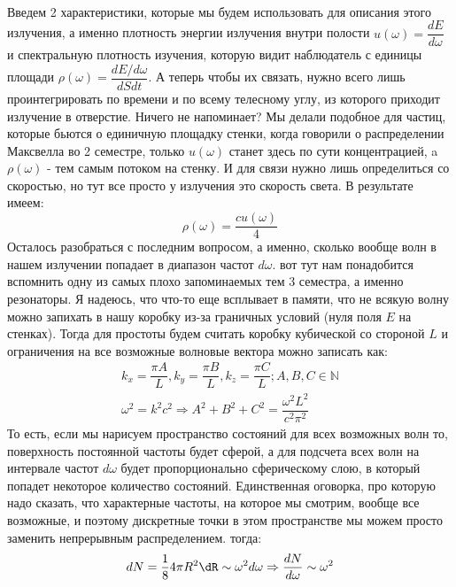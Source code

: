 \documentclass[12pt]{article}
\begin{document}
\\
Введем 2 характеристики, которые мы будем использовать для описания этого излучения, а именно плотность энергии излучения внутри полости $u(\omega) = \dfrac{dE}{d\omega}$ и спектральную плотность изучения, которую видит наблюдатель с единицы площади $\rho(\omega) = \dfrac{dE/d\omega}{dSdt}$. А теперь чтобы их связать, нужно всего лишь проинтегрировать по времени и по всему телесному углу, из которого приходит излучение в отверстие. Ничего не напоминает? Мы делали подобное для частиц, которые бьются о единичную площадку стенки, когда говорили о распределении Максвелла во 2 семестре, только $u(\omega)$ станет здесь по сути концентрацией, a $\rho(\omega)$ - тем самым потоком на стенку. И для связи нужно лишь определиться со скоростью, но тут все просто у излучения это скорость света. В результате имеем:
\begin{equation}
    \rho(\omega) = \dfrac{cu(\omega)}{4}
\end{equation}
Осталось разобраться с последним вопросом, а именно, сколько вообще волн в нашем излучении попадает в диапазон частот $d\omega$. вот тут нам понадобится вспомнить одну из самых плохо запоминаемых тем 3 семестра, а именно резонаторы. Я надеюсь, что что-то еще всплывает в памяти, что не всякую волну можно запихать в нашу коробку из-за граничных условий (нуля поля $E$ на стенках). Тогда для простоты будем считать коробку кубической со стороной $L$ и ограничения на все возможные волновые вектора можно записать как:
\begin{gather*}
    k_x = \dfrac{\pi A}{L}, k_y = \dfrac{\pi B}{L}, k_z = \dfrac{\pi C}{L}; A, B, C\in \mathbb{N}\\
    \omega^2 = k^2c^2 \Rightarrow A^2+B^2+C^2 = \dfrac{\omega^2L^2}{c^2\pi^2}
\end{gather*}
То есть, если мы нарисуем пространство состояний для всех возможных волн то, поверхность постоянной частоты будет сферой, а для подсчета всех волн на интервале частот $d\omega$ будет пропорционально сферическому слою, в который попадет некоторое количество состояний. Единственная оговорка, про которую надо сказать, что характерные частоты, на которое мы смотрим, вообще все возможные, и поэтому дискретные точки в этом пространстве мы можем просто заменить непрерывным распределением. тогда:
\begin{equation}
    dN = \dfrac{1}{8}4\pi R^2 \dR \sim \omega^2d\omega \Rightarrow \dfrac{dN}{d\omega} \sim \omega^2
\end{equation}
\\
\end{document}
